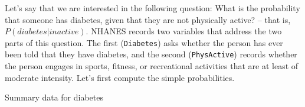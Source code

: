 \documentclass[]{book}
\newenvironment{Shaded}{\begin{snugshade}}{\end{snugshade}}
\newcommand{\KeywordTok}[1]{\textcolor[rgb]{0.13,0.29,0.53}{\textbf{#1}}}
\newcommand{\DataTypeTok}[1]{\textcolor[rgb]{0.13,0.29,0.53}{#1}}
\newcommand{\StringTok}[1]{\textcolor[rgb]{0.31,0.60,0.02}{#1}}
\newcommand{\CommentTok}[1]{\textcolor[rgb]{0.56,0.35,0.01}{\textit{#1}}}
\newcommand{\OtherTok}[1]{\textcolor[rgb]{0.56,0.35,0.01}{#1}}
\newcommand{\OperatorTok}[1]{\textcolor[rgb]{0.81,0.36,0.00}{\textbf{#1}}}
\newcommand{\NormalTok}[1]{#1}
\theoremstyle{definition}
\theoremstyle{definition}
\theoremstyle{definition}
\theoremstyle{remark}
\begin{document}
Let's say that we are interested in the following question: What is the
probability that someone has diabetes, given that they are not
physically active? -- that is, \(P(diabetes|inactive)\). NHANES records
two variables that address the two parts of this question. The first
(\texttt{Diabetes}) asks whether the person has ever been told that they
have diabetes, and the second (\texttt{PhysActive}) records whether the
person engages in sports, fitness, or recreational activities that are
at least of moderate intensity. Let's first compute the simple
probabilities.

\begin{Shaded}
\end{Shaded}

Summary data for diabetes

\begin{Shaded}
\end{Shaded}
\end{document}
